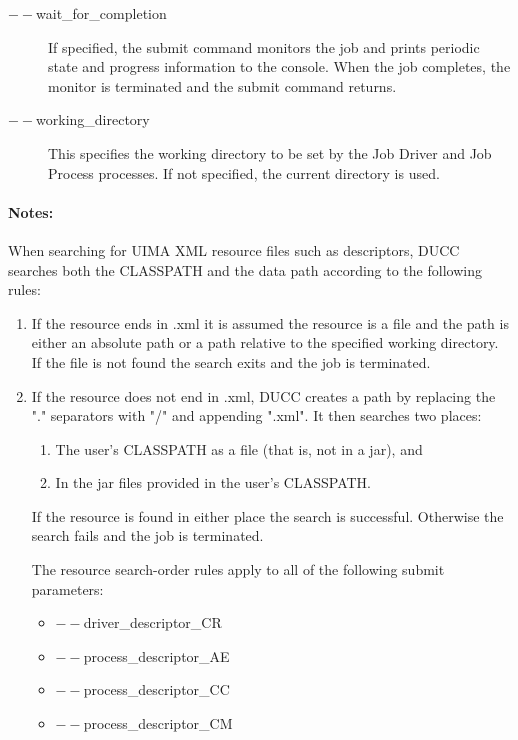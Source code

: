 \begin{description}
           \item[$--$wait\_for\_completion ]             
             If specified, the submit command monitors the job and prints periodic
             state and progress information to the console.  When the job completes, the monitor
             is terminated and the submit command returns.
             
           \item[$--$working\_directory ]             
             This specifies the working directory to be set by the Job Driver and Job Process processes. 
             If not specified, the current directory is used.
  \end{description}
             
  \paragraph{Notes:}
  \label{par:cli.submit.notes}
  When searching for UIMA XML resource files such as descriptors, DUCC searches both the 
  CLASSPATH and the data path according to the following rules: 
  
  \begin{enumerate}
  \item If the resource ends in .xml it is assumed the resource is a file and the path is either an 
    absolute path or a path relative to the specified working directory. If the file is not found 
    the search exits and the job is terminated. 
    
  \item If the resource does not end in .xml, DUCC creates a path by replacing the "." 
    separators with "/" and appending ".xml". It then searches two places: 
    \begin{enumerate}
    \item The user's CLASSPATH as a file (that is, not in a jar), and 
    \item In the jar files provided in the user's CLASSPATH. 
    \end{enumerate}
    If the resource is found in either place the search is successful. Otherwise the search 
    fails and the job is terminated. 
    
    The resource search-order rules apply to all of the following submit parameters: 
    \begin{itemize}
    \item[]$--$driver\_descriptor\_CR 
    \item[]$--$process\_descriptor\_AE 
    \item[]$--$process\_descriptor\_CC 
    \item[]$--$process\_descriptor\_CM 
   \end{itemize}
 \end{enumerate}
